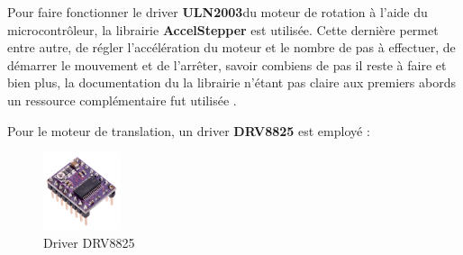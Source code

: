 Pour faire fonctionner le driver \textbf{ULN2003}du moteur de rotation à l'aide du microcontrôleur, la librairie \textbf{AccelStepper}\autocite{librairie_accelstepper} est utilisée.
Cette dernière permet entre autre, de régler l'accélération du moteur et le nombre de pas à effectuer, de démarrer le mouvement et de l'arrêter, savoir combiens de pas il reste à faire et bien plus,
la documentation du la librairie n'étant pas claire aux premiers abords un ressource complémentaire fut utilisée \autocite{AccelStepper_manual}.

Pour le moteur de translation, un driver \textbf{DRV8825} est employé :

\begin{figure}[H]
    \centering
    \includegraphics[width = 0.2\textwidth]{assets/figures/ameliorations/drv-8825.jpg}
    \caption[Driver DRV8825]{Driver DRV8825 \autocite{driver_DRV8825}\footnotemark}
\end{figure}
